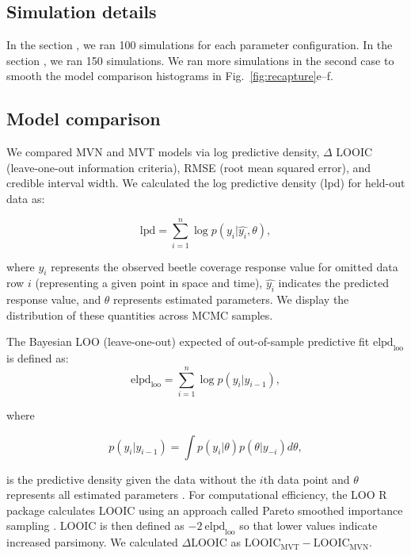 \documentclass[12pt,english]{article}
\newcommand{\R}[1]{\label{#1}\linelabel{#1}}
\begin{document}
\begin{spacing}{1.4}
\subsection{Simulation details}

In the section \emph{}, we ran 100 simulations for
each parameter configuration.
In the section \emph{}, we ran 150 simulations.
We ran more simulations in the second case to smooth the model
comparison histograms in Fig.~\ref{fig:recapture}e--f.

\subsection{Model comparison}

We compared MVN and MVT models via log predictive density, $\Delta$ LOOIC
(leave-one-out information criteria), RMSE (root mean squared error), and
credible interval width. We calculated the log predictive density (lpd) for
held-out data as:

\begin{equation}
  \mathrm{lpd} = \sum^{n}_{i=1}{\log  p(y_{i} |
      \widehat{y_{i}}, \theta)},
\end{equation}

\noindent where $y_{i}$ represents the observed beetle coverage response value
for omitted data row $i$ (representing a given point in space and time),
$\widehat{y_{i}}$ indicates the predicted response value, and $\theta$
represents estimated parameters. We display the distribution of these quantities
across MCMC samples.

The Bayesian LOO (leave-one-out) expected of out-of-sample
predictive fit $\mathrm{elpd}_\mathrm{loo}$ is defined as:
\begin{equation}
  \mathrm{elpd}_\mathrm{loo} = \sum^{n}_{i=1}{\log  p(y_i | y_{i-1}) },
\end{equation}

\noindent where

\begin{equation}
  p(y_i | y_{i-1}) = \int p(y_i | \theta) p (\theta | y_{-i}) d \theta ,
\end{equation}

\noindent is the predictive density given the data without the $i$th data point
and $\theta$ represents all estimated parameters
\citep{vehtari2017}. For computational efficiency, the LOO R package calculates
LOOIC using an approach called Pareto smoothed importance sampling
\citep{vehtari2017}. LOOIC is then defined as $-2\ \mathrm{elpd}_\mathrm{loo}$
so that lower values indicate increased parsimony.\R{B3}
We calculated $\Delta$LOOIC as $\mathrm{LOOIC}_\mathrm{MVT}
- \mathrm{LOOIC}_\mathrm{MVN}$.


\end{spacing}
\end{document}
